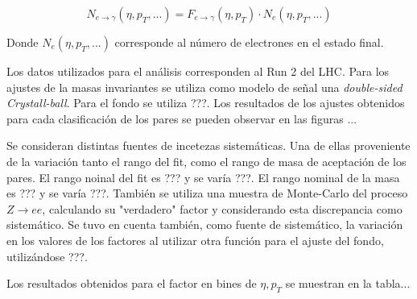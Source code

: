 \begin{equation}
N_{e\rightarrow\gamma}(\eta , p_{T} , ... )=F_{e\rightarrow\gamma}(\eta , p_{T})\cdot N_{e}(\eta , p_{T} , ...)
\end{equation}
	
Donde $N_{e}(\eta , p_{T} , ...)$ corresponde al número de electrones en el estado final.

Los datos utilizados para el análisis corresponden al Run 2 del LHC. Para los ajustes de la masas invariantes se utiliza como modelo de señal una \textit{double-sided Crystall-ball}. Para el fondo se utiliza ???. Los resultados de los ajustes obtenidos para cada clasificación de los pares se pueden observar en las figuras ...

Se consideran distintas fuentes de incetezas sistemáticas. Una de ellas proveniente de la variación tanto el rango del fit, como el rango de masa de aceptación de los pares. El rango noinal del fit es ??? y se varía ???. El rango nominal de la masa es ??? y se varía ???. También se utiliza una muestra de Monte-Carlo del proceso $Z\rightarrow ee$, calculando su "verdadero" factor y considerando esta discrepancia como sistemático. Se tuvo en cuenta también, como fuente de sistemático, la variación en los valores de los factores al utilizar otra función para el ajuste del fondo, utilizándose ???.

Los resultados obtenidos para el factor en bines de $\eta , p_{T}$ se muestran en la tabla...